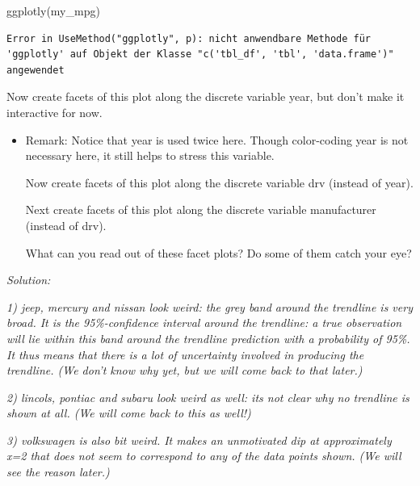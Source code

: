 \documentclass[
  letterpaper,
  DIV=11,
  numbers=noendperiod]{scrartcl}
\newenvironment{Shaded}{\begin{snugshade}}{\end{snugshade}}
\newcommand{\FunctionTok}[1]{\textcolor[rgb]{0.28,0.35,0.67}{#1}}
\newcommand{\NormalTok}[1]{\textcolor[rgb]{0.00,0.23,0.31}{#1}}
\begin{document}
\begin{Shaded}
\begin{Highlighting}[]
\FunctionTok{ggplotly}\NormalTok{(my\_mpg)}
\end{Highlighting}
\end{Shaded}

\begin{verbatim}
Error in UseMethod("ggplotly", p): nicht anwendbare Methode für 'ggplotly' auf Objekt der Klasse "c('tbl_df', 'tbl', 'data.frame')" angewendet
\end{verbatim}

Now create facets of this plot along the discrete variable year, but
don't make it interactive for now.

\begin{itemize}
\item
  Remark: Notice that year is used twice here. Though color-coding year
  is not necessary here, it still helps to stress this variable.

  Now create facets of this plot along the discrete variable drv
  (instead of year).

  Next create facets of this plot along the discrete variable
  manufacturer (instead of drv).

  What can you read out of these facet plots? Do some of them catch your
  eye?
\end{itemize}

\emph{Solution:}

\emph{1) jeep, mercury and nissan look weird: the grey band around the
trendline is very broad. It is the 95\%-confidence interval around the
trendline: a true observation will lie within this band around the
trendline prediction with a probability of 95\%. It thus means that
there is a lot of uncertainty involved in producing the trendline. (We
don't know why yet, but we will come back to that later.)}

\emph{2) lincols, pontiac and subaru look weird as well: its not clear
why no trendline is shown at all. (We will come back to this as well!)}

\emph{3) volkswagen is also bit weird. It makes an unmotivated dip at
approximately x=2 that does not seem to correspond to any of the data
points shown. (We will see the reason later.)}
\end{document}
